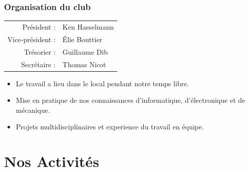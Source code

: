 \documentclass[9pt]{beamer}
\begin{document}
\begin{frame}
	\frametitle{Organisation du club}
	
	
	\begin{tabular}{ r l }
	   Président : & Ken Hasselmann \\
	   Vice-président : & Élie Bouttier  \\
	   Trésorier : & Guillaume Dib  \\
	   Secrétaire : & Thomas Nicot  \\
	\end{tabular}

	\begin{itemize}
		\item Le travail a lieu dans le local pendant notre temps libre.
		\item Mise en pratique de nos connaissances d'informatique, d'électronique et de mécanique.
		\item Projets multidisciplinaires et experience du travail en équipe.
	\end{itemize}

\end{frame}



\section{Nos Activités}
\end{document}
